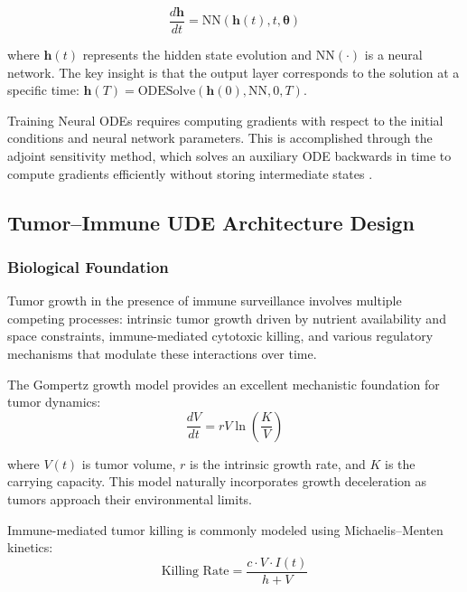 \documentclass{juliacon}
\begin{document}
\begin{equation}
\frac{d\mathbf{h}}{dt} = \text{NN}(\mathbf{h}(t), t, \boldsymbol{\theta})
\label{eq:neural_ode}
\end{equation}

where $\mathbf{h}(t)$ represents the hidden state evolution and $\text{NN}(\cdot)$ is a neural network. The key insight is that the output layer corresponds to the solution at a specific time: $\mathbf{h}(T) = \text{ODESolve}(\mathbf{h}(0), \text{NN}, 0, T)$.

Training Neural ODEs requires computing gradients with respect to the initial conditions and neural network parameters. This is accomplished through the adjoint sensitivity method, which solves an auxiliary ODE backwards in time to compute gradients efficiently without storing intermediate states \cite{kim2021stiff}.

\subsection{Tumor--Immune UDE Architecture Design}

\subsubsection{Biological Foundation}

Tumor growth in the presence of immune surveillance involves multiple competing processes: intrinsic tumor growth driven by nutrient availability and space constraints, immune-mediated cytotoxic killing, and various regulatory mechanisms that modulate these interactions over time.

The Gompertz growth model provides an excellent mechanistic foundation for tumor dynamics:
\begin{equation}
\frac{dV}{dt} = rV\ln\left(\frac{K}{V}\right)
\label{eq:gompertz}
\end{equation}

where $V(t)$ is tumor volume, $r$ is the intrinsic growth rate, and $K$ is the carrying capacity. This model naturally incorporates growth deceleration as tumors approach their environmental limits.

Immune-mediated tumor killing is commonly modeled using Michaelis--Menten kinetics:
\begin{equation}
\text{Killing Rate} = \frac{c \cdot V \cdot I(t)}{h + V}
\label{eq:michaelis_menten_killing}
\end{equation}
\end{document}
